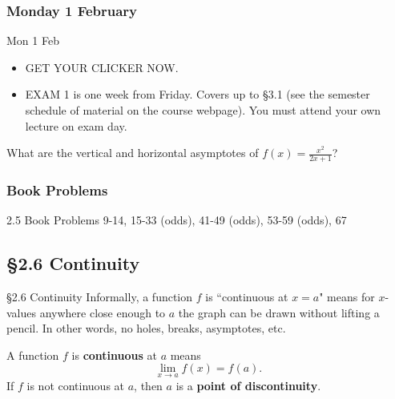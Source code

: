 \documentclass[cal1spr16Lectures.tex]{subfiles}
\begin{document}

\subsubsection{\bf Monday 1 February}
\begin{frame}[allowframebreaks]{Mon 1 Feb}
\begin{itemize}%
\item GET YOUR CLICKER NOW.  	
\item EXAM 1 is one week from Friday.  Covers up to \S 3.1 (see the semester schedule of material on the course webpage).  \alert{You must attend your own lecture on exam day.}
\end{itemize}
\end{frame}

\begin{frame}
\begin{exe}
What are the vertical and horizontal asymptotes of $f(x)=\frac{x^2}{2x+1}$?
\end{exe}
\end{frame}

\subsubsection{Book Problems}
\begin{frame}
\begin{block}{2.5 Book Problems} 9-14, 15-33 (odds), 41-49 (odds), 53-59 (odds), 67  \end{block} 
\end{frame}

\subsection[2.6 Continuity]{\S 2.6 Continuity}

\begin{frame}{\S 2.6 Continuity}\footnotesize
Informally, a function $f$ is ``continuous at $x=a$" means for $x$-values anywhere close enough to $a$ the graph can be drawn without lifting a pencil.  In other words, no holes, breaks, asymptotes, etc.
\begin{dfn} A function $f$ is {\bf continuous} at $a$ means
\[\lim_{x \to a} f(x)=f(a).\]  
If $f$ is not continuous at $a$, then $a$ is a {\bf point of discontinuity}. \end{dfn}
\end{frame}
\end{document}
